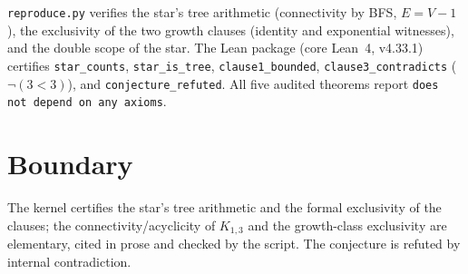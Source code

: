 \documentclass[11pt]{article}
\begin{document}
\texttt{reproduce.py} verifies the star's tree arithmetic
(connectivity by BFS, $E = V - 1$), the exclusivity of the two
growth clauses (identity and exponential witnesses), and the double
scope of the star.  The Lean package (core Lean~4, v4.33.1)
certifies \texttt{star\_counts}, \texttt{star\_is\_tree},
\texttt{clause1\_bounded}, \texttt{clause3\_contradicts}
($\neg(3 < 3)$), and \texttt{conjecture\_refuted}.  All five
audited theorems report \texttt{does not depend on any axioms}.

\section{Boundary}

The kernel certifies the star's tree arithmetic and the formal
exclusivity of the clauses; the connectivity/acyclicity of
$K_{1,3}$ and the growth-class exclusivity are elementary, cited
in prose and checked by the script.  The conjecture is refuted by
internal contradiction.
\end{document}
